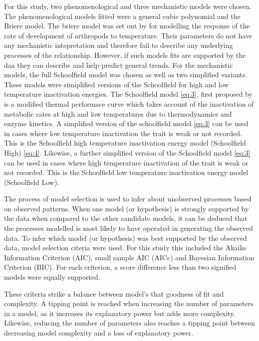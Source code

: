 \documentclass[11pt]{article}
\begin{document}
	For this study, two phenomenological and three mechanistic models were chosen. The phenomenological models fitted were a general cubic polynomial and the Briere model. The briere model was set out by \citep{briere1999novel} for modelling the response of the rate of development of arthropods to temperature. Their parameters do not have any mechanistic intepretation and therefore fail to describe any underlying processes of the relationship. However, if such models fits are supported by the daa they can describe and help predict general trends. For the mechanistic models, the full Schoolfield model was chosen as well as two simplified variants. These models were simiplified versions of the Schoolfield for high and low temperature inactivation energies. The Schoolfield model \eqref{eq:3}, first proposed by \citep{schoolfield1981non} is a modified thermal performace curve which takes account of the inactivation of metabolic rates at high and low temperatures due to thermodynamics and enzyme kinetics. A simplified version of the schoolfield model \eqref{eq:3} can be used in cases where low temperature inactivation the trait is weak or not recorded. This is the Schoolfield high temperature inactivation energy model (Schoolfield High) \eqref{eq:4}. Likewise, a further simplified version of the Schoolfield model \eqref{eq:3} can be used in cases where high temperature inactivation of the trait is weak or not recorded. This is the Schoolfield low temperature inactivation energy model (Schoolfield Low). 
	
	The process of model selection is used to infer about unobserved processes based on observed patterns. When one model (or hypothesis) is strongly supported by the data when compared to the other candidate models, it can be deduced that the processes modelled is most likely to have operated in generating the observed data. To infer which model (or hypothesis) was best supported by the observed data, model selection citeria  were used. For this study this included the Akaike Information Criterion (AIC), small sample AIC (AICc) and Bayesian Information Criterion (BIC). For each criterion, a score difference less than two signified models were equally supported. 
	
	These criteria strike a balance between model's that goodness of fit and complexity. A tipping point is reached when increasing the number of parameters in a model, as it increases its explanatory power but adds more complexity. Likewise, reducing the number of parameters also reaches a tipping point between decreasing model complexity and a loss of explanatory power. 
	 
\end{document}
